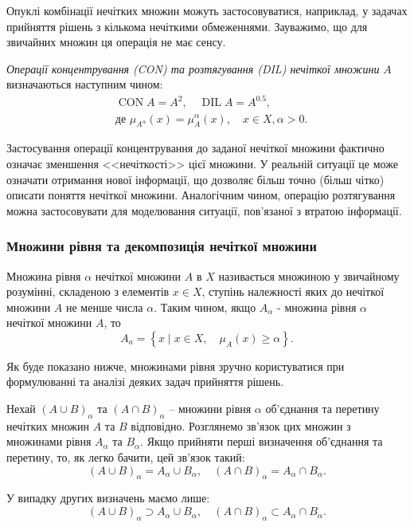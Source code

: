 \documentclass[14pt, a4paper, oneside]{extarticle}
\numberwithin{equation}{section}
\begin{document}
Опуклі комбінації нечітких множин можуть застосовуватися, наприклад, у задачах прийняття рішень з кількома нечіткими обмеженнями. Зауважимо, що для звичайних множин ця операція не має сенсу.

\textit{Операції концентрування (CON) та розтягування (DIL) нечіткої множини} $A$ визначаються наступним чином:
\begin{align}
& \operatorname{CON} A = A^2, \quad \operatorname{DIL} A = A^{0.5},\\
& \text{де } \mu_{A^\alpha}(x) = \mu_A^\alpha(x), \quad x\in X, \alpha > 0.
\end{align}

Застосування операції концентрування до заданої нечіткої множини фактично означає зменшення <<нечіткості>> цієї множини. У реальній ситуації це може означати отримання нової інформації, що дозволяє більш точно (більш чітко) описати поняття нечіткої множини. Аналогічним чином, операцію розтягування можна застосовувати для моделювання ситуації, пов'язаної з втратою інформації.

\subsubsection{Множини рівня та декомпозиція нечіткої множини}

Множина рівня $\alpha$ нечіткої множини $A$ в $X$ називається множиною у звичайному розумінні, складеною з елементів $x \in X$, ступінь належності яких до нечіткої множини $A$ не менше числа $\alpha$. Таким чином, якщо $A_\alpha$ - множина рівня $\alpha$ нечіткої множини $A$, то
\begin{equation}
A_a=\left\{x \mid x \in X, \quad \mu_A(x) \geq \alpha\right\} .
\end{equation}

Як буде показано нижче, множинами рівня зручно користуватися при формулюванні та аналізі деяких задач прийняття рішень.

Нехай $(A \cup B)_\alpha$ та $(A \cap B)_\alpha$ -- множини рівня $\alpha$ об'єднання та перетину нечітких множин $A$ та $B$ відповідно. Розглянемо зв'язок цих множин з множинами рівня $A_\alpha$ та $B_{\alpha}$. Якщо прийняти перші визначення об'єднання та перетину, то, як легко бачити, цей зв'язок такий:
\begin{equation}
(A \cup B)_\alpha=A_\alpha \cup B_\alpha, \quad(A \cap B)_\alpha=A_\alpha \cap B_{\alpha}.
\end{equation}

У випадку других визначень маємо лише:
\begin{equation}
(A \cup B)_\alpha \supset A_\alpha \cup B_\alpha, \quad(A \cap B)_\alpha \subset A_\alpha \cap B_{\alpha}.
\end{equation}
\end{document}
